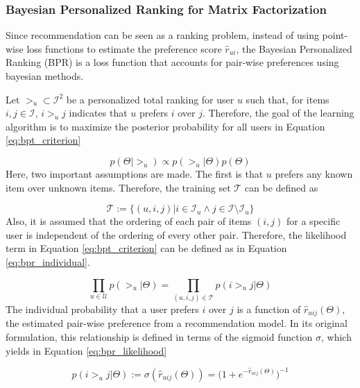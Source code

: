    \subsubsection{Bayesian Personalized Ranking for Matrix Factorization}
   
   Since recommendation can be seen as a ranking problem, instead of using point-wise loss functions to estimate the preference score $\hat{r}_{ui}$, the Bayesian Personalized Ranking (BPR)  is a loss function that accounts for pair-wise preferences using bayesian methods. 
   
   Let $>_u \subset \mathcal{I}^2$ be a personalized total ranking for user $u$ such that, for items $i, j \in \mathcal{I}$, $i >_u j$ indicates that $u$ prefers $i$ over $j$. Therefore, the goal of the learning algorithm is to maximize the posterior probability for all users in Equation \ref{eq:bpt_criterion}
   
   \begin{equation}
       p(\Theta | >_u) \propto p( >_u | \Theta) p(\Theta)
       \label{eq:bpt_criterion}
   \end{equation} Here, two important assumptions are made. The first is that $u$ prefers any known item over unknown items. Therefore, the training set $\mathcal{T}$ can be defined as 
   
   \begin{equation}
       \mathcal{T} := \{(u, i, j) | i \in \mathcal{I}_u \wedge j \in \mathcal{I} \setminus \mathcal{I}_u\}
   \end{equation}Also, it is assumed that the ordering of each pair of items $(i, j)$ for a specific user is independent of the ordering of every other pair. Therefore, the likelihood term in Equation \ref{eq:bpt_criterion} can be defined as in Equation \ref{eq:bpr_individual}.
   
   \begin{equation}
       \prod_{u \in \mathcal{U}} p(>_u | \Theta) = \prod_{(u, i, j) \in \mathcal{T}} p(i >_u j | \Theta)
       \label{eq:bpr_individual}
   \end{equation}The individual probability that a user prefers $i$ over $j$ is a function of $\hat{r}_{uij}(\Theta)$, the estimated pair-wise preference from a recommendation model. In its original formulation, this relationship is defined in terms of the sigmoid function $\sigma$, which yields in Equation \ref{eq:bpr_likelihood}
   
   \begin{equation}
       p(i >_u j | \Theta) := \sigma(\hat{r}_{uij}(\Theta)) = \Big(1+e^{-\hat{r}_{uij}(\Theta)}\Big)^{-1}
       \label{eq:bpr_likelihood}
   \end{equation}
   
